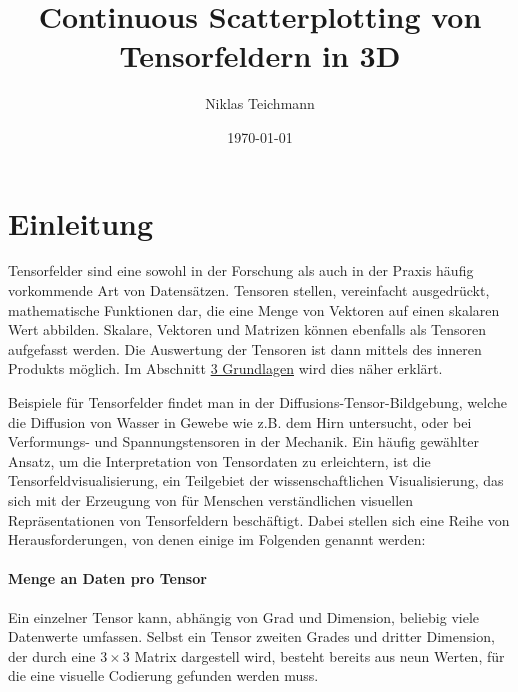 \documentclass[a4paper,fontsize=12pt,toc=bib,halfparskip,ngerman]{scrartcl}
\title{Continuous Scatterplotting von Tensorfeldern in 3D\xspace}
\author{Niklas Teichmann}
\date{\today}
\begin{document}
\maketitle\clearpage
\thispagestyle{empty}
\tableofcontents
\thispagestyle{empty}
\clearpage



\section{Einleitung}
Tensorfelder sind eine sowohl in der Forschung als auch in der Praxis h\"aufig vorkommende Art von Datens\"atzen. Tensoren stellen, vereinfacht ausgedr\"uckt, mathematische Funktionen dar, die eine Menge von Vektoren auf einen skalaren Wert abbilden. Skalare, Vektoren und Matrizen können ebenfalls als Tensoren aufgefasst werden. Die Auswertung der Tensoren ist dann mittels des inneren Produkts möglich. Im Abschnitt \hyperref[sec:Grundlagen]{3 Grundlagen} wird dies näher erklärt.

Beispiele f\"ur Tensorfelder findet man in der Diffusions-Tensor-Bildgebung\cite{basser1994mr}, welche die Diffusion von Wasser in Gewebe wie z.B. dem Hirn untersucht, oder bei Verformungs-\cite[S.~122]{FundamentalsofStructuralMechanics} und Spannungstensoren\cite[S.~154]{FundamentalsofStructuralMechanics} in der Mechanik. Ein h\"aufig gew\"ahlter Ansatz, um die Interpretation von Tensordaten zu erleichtern, ist die Tensorfeldvisualisierung, ein Teilgebiet der wissenschaftlichen Visualisierung, das sich mit der Erzeugung von f\"ur Menschen verst\"andlichen visuellen Repr\"asentationen von Tensorfeldern besch\"aftigt. Dabei stellen sich eine Reihe von Herausforderungen, von denen einige im Folgenden genannt werden\cite{hlawitschka2014top}\cite{fritzsch2016continuousScatterplot}:

\paragraph{Menge an Daten pro Tensor}
Ein einzelner Tensor kann, abh\"angig von Grad und Dimension, beliebig viele Datenwerte umfassen. Selbst ein Tensor zweiten Grades und dritter Dimension, der durch eine $3 \times 3$ Matrix dargestell wird, besteht bereits aus neun Werten, f\"ur die eine visuelle Codierung gefunden werden muss.
\end{document}
